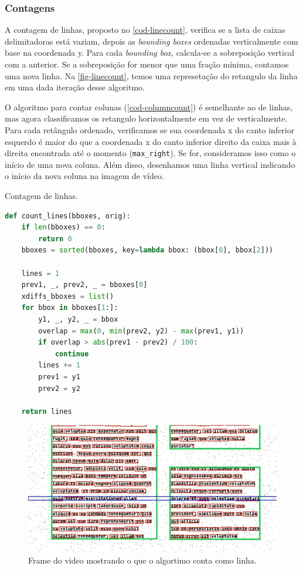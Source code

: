 \documentclass[english, 
               brazil, 
               bsc] %
               {dcomp-abntex2}
\begin{document}
\subsubsection{Contagens}

A contagem de linhas, proposto no \autoref{cod-linecount}, verifica se a lista de caixas delimitadoras está vaziam, depois as \textit{bounding boxes} ordenadas verticalmente com base na coordenada y. Para cada \textit{bounding box}, calcula-se a sobreposição vertical com a anterior. Se a sobreposição for menor que uma fração mínima, contamos uma nova linha. Na \autoref{fig-linecount}, temos uma represetação do retangulo da linha em uma dada iteração desse algoritmo.

O algoritmo para contar colunas (\autoref{cod-columncount}) é semelhante ao de linhas, mas agora classificamos os retangulo horizontalmente em vez de verticalmente. Para cada retângulo ordenado, verificamos se sua coordenada x do canto inferior esquerdo é maior do que a coordenada x do canto inferior direito da caixa mais à direita encontrada até o momento (\texttt{max\_right}). Se for, consideramos isso como o início de uma nova coluna. Além disso, desenhamos uma linha vertical indicando o início da nova coluna na imagem de vídeo.

\begin{codigo}[h]
  \caption{\small Contagem de linhas.}
 \label{cod-linecount}
\begin{lstlisting}[language=python]
def count_lines(bboxes, orig):
    if len(bboxes) == 0:
        return 0
    bboxes = sorted(bboxes, key=lambda bbox: (bbox[0], bbox[2]))

    lines = 1
    prev1, _, prev2, _ = bboxes[0]
    xdiffs_bboxes = list()
    for bbox in bboxes[1:]:
        y1, _, y2, _ = bbox
        overlap = max(0, min(prev2, y2) - max(prev1, y1))
        if overlap > abs(prev1 - prev2) / 100:
            continue
        lines += 1
        prev1 = y1
        prev2 = y2

    return lines
\end{lstlisting}
\end{codigo}


\begin{figure}[htb]
        \caption{\label{fig-linecount} \small Frame do video mostrando o que o algortimo conta como linha. }
        \begin{center}
            \includegraphics[scale=0.55]{./images/cascadia_line.png}
        \end{center}
\end{figure}
\end{document}
